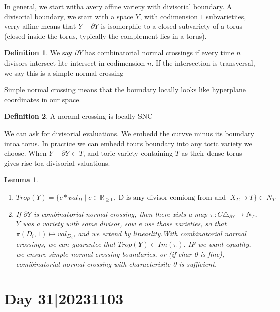 \documentclass[12pt]{memoir}
\newtheorem{protolemma}[prototheorem]{Lemma}
\newenvironment{lemma}
   {\begin{protolemma}}
   {\end{protolemma}}
\theoremstyle{definition}
\newtheorem{protodefinition}{Definition}[section]
\newenvironment{define}
   {\begin{protodefinition}}
   {\end{protodefinition}}
\def\RR{{\mathbb R}}
\begin{document}
In general, we start witha  avery affine variety with divisorial boundary. A divisorial boundary, we start with a space $Y$, with codimension $1$ subvarietiies, verry affine means that $Y- \partial Y$ is isomorphic to a closed subvariety of a torus (closed inside the torus, typically the complement lies in a torus).

\begin{define}
    We say $\partial Y$ has combinatorial normal crossings if every time $n$ divisors intersect hte intersect in codimension $n$. If the intersection is transversal, we say this is a simple normal crossing
\end{define}

Simple normal crossing means that the boundary locally looks like hyperplane coordinates in our space.

\begin{define}
A noraml crossing is locally SNC
\end{define}






We can ask for divisorial evaluations. We embedd the curvve minus its boundary intoa  torus. In practice we can embedd tours boundary into any toric variety we choose. When $Y- \partial Y \subset T$, and toric variety containing $T$ as their dense torus gives rise toa  divisorial valuations.

\begin{lemma}
    \begin{enumerate}
        \item $Trop(Y) = \{c *val_D \; |\; c \in \RR_{\geq 0}, \ \text{D is any divisor comiong from and }\; X_\Sigma \supset T\} \subset N_T$
        \item If $\partial Y$ is combinatorial normal crossing, then there xists a map $\pi: C \triangle_{\partial Y} \rightarrow N_T$, $Y$ was a variety with some divisor, sow e use those varieties, so that $\pi(D_i,1) \mapsto val_{D_i}$, and we extend by linearlity.With combinatorial normal crossings, we can guarantee that $Trop(Y) \subset Im(\pi)$. IF we want equality, we ensure simple normal crossing boundaries, or (if char 0 is fine), comibinatorial normal crossing with characterisitc 0 is sufficient.
    \end{enumerate}
\end{lemma}


\section{Day 31|20231103}
\end{document}
